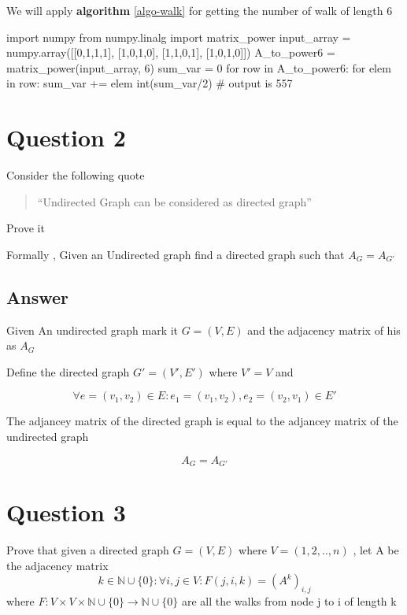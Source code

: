 \documentclass[9pt,twocolumn]{article}
\theoremstyle{definition}
\begin{document}
We will apply \textbf{algorithm} \ref{algo-walk}  for getting the number of walk of length 6

\label{calculate-walks}
\begin{python}
import numpy
from numpy.linalg import matrix_power
input_array = numpy.array([[0,1,1,1],
                           [1,0,1,0],
                           [1,1,0,1],
                           [1,0,1,0]])
A_to_power6 = matrix_power(input_array, 6)
sum_var = 0
for row in A_to_power6:
    for elem in row:
        sum_var += elem
int(sum_var/2)
# output is 557
\end{python}



\section*{Question 2}
\label{sec:orge3642a3}
Consider the following quote
\begin{quote}
``Undirected Graph can be considered as directed graph''
\end{quote}
Prove it

Formally , Given an Undirected graph find a directed graph such that \(A_G = A_{G'}\)


\subsection*{Answer}
\label{sec:org35d92a6}
Given An undirected graph mark it \(G=(V,E)\) and the adjacency matrix of his as \(A_G\)

Define the directed graph \(G'=(V',E')\) where \(V'=V\) and

\[ \forall e=(v_1,v_2)\in E : e_1=(v_1,v_2) , e_2=(v_2,v_1)\in E'  \]

The adjancey matrix of the directed graph is equal to the adjancey matrix of the undirected graph

\[ A_G=A_{G'} \]


\section*{Question 3}
\label{sec:org79c8969}
Prove that given a directed graph \(G=(V,E)\) where \(V=(1,2,..,n)\) , let A be the adjacency matrix
\[ k \in \mathbb{N}\cup{\{0\}}: \forall i,j\in V : F(j,i ,k)=(A^k)_{i,j} \]
where \(F:V \times V \times \mathbb{N}\cup{\{0\}} \rightarrow \mathbb{N}\cup{\{0\}}\)
are all the walks from node j to i of length k
\end{document}
